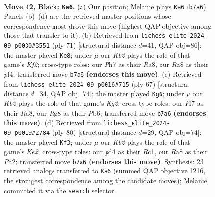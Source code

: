 \documentclass[11pt]{article}
\begin{document}
\clearpage

\begin{figure}[p]\centering
\begin{subfigure}{0.46\textwidth}\centering
\resizebox{\linewidth}{!}{%
\newchessgame
\chessboard[
  setfen={r5r1/1k1Q1p1p/1pp5/8/3P4/1R4PP/5P2/6K1 b - - 1 42},
  showmover=false,
  pgfstyle=straightmove, color=movearrow, markmove={b7-a6}
]}
\caption{}
\end{subfigure}\hfill
\begin{subfigure}{0.46\textwidth}\centering
\resizebox{\linewidth}{!}{%
\newchessgame
\chessboard[
  setfen={r7/1p2pk1Q/2r3p1/8/2P2P1P/2R5/6PK/q7 b - - 0 36},
  showmover=false,
  pgfstyle=straightmove, color=movearrow, markmove={f7-e8}
]}
\caption{}
\end{subfigure}
\\[4pt]
\begin{subfigure}{0.46\textwidth}\centering
\resizebox{\linewidth}{!}{%
\newchessgame
\chessboard[
  setfen={3r1r2/p5k1/1p6/3pQ3/8/4P3/PP3P1P/7K b - - 5 34},
  showmover=false,
  pgfstyle=straightmove, color=movearrow, markmove={g7-g6}
]}
\caption{}
\end{subfigure}\hfill
\begin{subfigure}{0.46\textwidth}\centering
\resizebox{\linewidth}{!}{%
\newchessgame
\chessboard[
  setfen={8/6pk/7p/P4p2/3q1P2/8/P2pK1rP/2RR4 w - - 0 41},
  showmover=false,
  pgfstyle=straightmove, color=movearrow, markmove={e2-f3}
]}
\caption{}
\end{subfigure}
\caption{\textbf{Move 42, Black: \texttt{Ka6}.} (a) Our position; Melanie plays \texttt{Ka6} (\texttt{b7a6}). Panels (b)--(d) are the retrieved master positions whose correspondence most drove this move (highest QAP objective among those that transfer to it). (b) Retrieved from \texttt{lichess\_elite\_2024-09\_p0030\#3551} (ply 71) [structural distance $d$=41, QAP obj=86]: the master played \texttt{Ke8}; under $\mu$ our \emph{Kb2} plays the role of that game's \emph{Kf2}; cross-type roles: our \emph{P}h7 as their \emph{R}a8, our \emph{R}a8 as their \emph{p}f4; transferred move \texttt{b7a6} \textbf{(endorses this move)}. (c) Retrieved from \texttt{lichess\_elite\_2024-09\_p0016\#715} (ply 67) [structural distance $d$=34, QAP obj=74]: the master played \texttt{Kg6}; under $\mu$ our \emph{Kb2} plays the role of that game's \emph{Kg2}; cross-type roles: our \emph{P}f7 as their \emph{R}d8, our \emph{R}g8 as their \emph{P}b6; transferred move \texttt{b7a6} \textbf{(endorses this move)}. (d) Retrieved from \texttt{lichess\_elite\_2024-09\_p0019\#2784} (ply 80) [structural distance $d$=29, QAP obj=74]: the master played \texttt{Kf3}; under $\mu$ our \emph{Kb2} plays the role of that game's \emph{Ke2}; cross-type roles: our \emph{p}d4 as their \emph{R}c1, our \emph{R}a8 as their \emph{P}a2; transferred move \texttt{b7a6} \textbf{(endorses this move)}. Synthesis: 23 retrieved analogs transferred to \texttt{Ka6} (summed QAP objective 1216, the strongest correspondence among the candidate moves); Melanie committed it via the \texttt{search} selector.}
\label{fig:thought-m83}
\end{figure}
\end{document}

